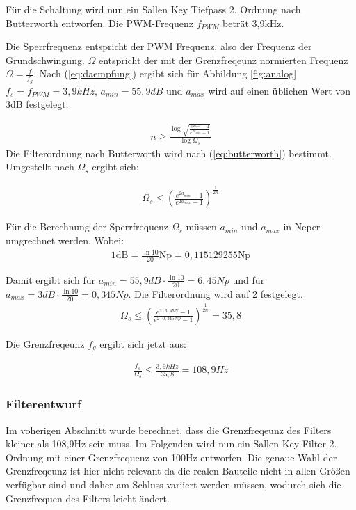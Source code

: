 Für die Schaltung wird nun ein Sallen Key Tiefpass 2. Ordnung nach Butterworth entworfen. Die PWM-Frequenz $f_{PWM}$ beträt 3,9kHz.

Die Sperrfrequenz entspricht der PWM Frequenz, also der Frequenz der Grundschwingung. $\Omega$ entspricht der mit der Grenzfreqeunz 
normierten Frequenz $\Omega=\frac{f}{f_g}$. Nach (\ref{eq:daempfung}) ergibt sich für Abbildung \ref{fig:analog}
$f_s=f_{PWM}=3,9 kHz$, $a_{min}=55,9 dB$ und $a_{max}$ wird auf einen üblichen Wert von 3dB festgelegt.







\begin{align}
n \ge \frac{\log{\sqrt{\frac{e^{2a_{min}}-1}{e^{2a_{max}}-1}}}}{\log{\Omega_s}}
\label{eq:butterworth}
\end{align}
Die Filterordnung nach Butterworth wird nach (\ref{eq:butterworth}) bestimmt\cite{AnalogFilter}. Umgestellt nach $\Omega_s$ ergibt sich:

\begin{align}
\Omega_s \le  \left(\frac{e^{2a_{min}}-1}{e^{2a_{max}}-1}\right)^{\frac{1}{2n}}
\end{align}



Für die Berechnung der Sperrfrequenz $\Omega_s$ müssen  $a_{min}$ und $a_{max}$ in Neper umgrechnet werden. Wobei:
\begin{align*}
1 \text{dB} =  \frac{\ln{10}}{20}\text{Np} = 0,115129255 \text{Np}   
\end{align*}

Damit ergibt sich für $a_{min}=55,9 dB\cdot \frac{\ln{10}}{20}=6,45Np$ und für  $a_{max}=3 dB\cdot \frac{\ln{10}}{20}=0,345Np$. Die Filterordnung wird auf 2 festgelegt.
\begin{align}
\Omega_s \le  \left(\frac{e^{2\cdot6,45N }-1}{e^{2\cdot 0,345Np}-1}\right)^{\frac{1}{2n}}  = 35,8
\end{align}

Die Grenzfreqeunz $f_g$ ergibt sich jetzt aus:

\begin{align}
\frac{f_s}{\Omega_s} \le \frac{3,9kHz}{35,8} = 108,9Hz
\end{align}

\subsubsection{Filterentwurf}
Im voherigen Abschnitt wurde berechnet, dass die Grenzfreqeunz des Filters kleiner als 108,9Hz sein muss.
Im Folgenden wird nun ein Sallen-Key Filter 2. Ordnung mit einer Grenzfrequenz von 100Hz entworfen.
Die genaue Wahl der Grenzfreqeunz ist hier nicht relevant da die realen Bauteile nicht in  allen Größen 
verfügbar sind und daher am Schluss variiert werden müssen, wodurch sich die Grenzfrequen des Filters leicht ändert.


